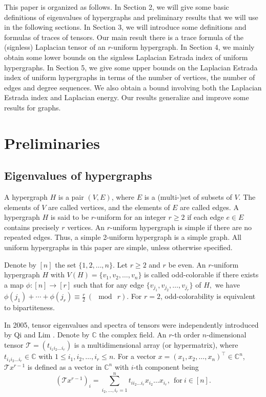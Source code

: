 \documentclass[11pt]{article}
\begin{document}
This paper is organized as follows. In Section 2, we will give some basic definitions of eigenvalues of hypergraphs and preliminary results that we will use in the following sections. In Section 3, we will introduce some definitions and formulas of traces of tensors. Our main result there is a trace formula of the (signless) Laplacian tensor of an $r$-uniform hypergraph. In Section 4, we mainly obtain some lower bounds on the signless Laplacian Estrada index of uniform hypergraphs. In Section 5, we give some upper bounds on the Laplacian Estrada index of uniform hypergraphs in terms of the number of vertices, the number of edges and degree sequences. We also obtain a bound involving both the Laplacian Estrada index and Laplacian energy. Our results generalize and improve some results for graphs.

\section{Preliminaries}
\label{sec:ch-sufficient}
\subsection{Eigenvalues of hypergraphs}

A hypergraph $H$ is a pair $(V,E)$, where $E$ is a (multi-)set of subsets of $V$.
The elements of $V$ are called vertices, and the elements of $E$ are called edges. A hypergraph $H$ is said to be $r$-uniform for an integer $r\geq 2$ if each edge $e\in E$ contains precisely $r$ vertices.  An $r$-uniform hypergraph is simple if there are no repeated edges. Thus, a simple 2-uniform
hypergraph is a simple graph.
All uniform hypergraphs in this paper are simple, unless otherwise specified.

Denote by $[n]$ the set $\{1,2, \ldots,n\}.$ Let $r \geq 2$ and $r$ be even. An $r$-uniform hypergraph $H$ with $V(H)=\{v_{1}, v_{2}, \ldots, v_{n}\}$ is called odd-colorable if there exists a map $\phi : [n] \rightarrow [r]$ such that for any edge $\{v_{j_{1}}, v_{j_{2}}, \ldots , v_{j_{r}}\}$ of $H,$ we have $\phi(j_{1}) + \cdots +\phi(j_{r}) \equiv \frac{r}{2}~(\mod~ r).$ For $r=2$, odd-colorability is equivalent to bipartiteness.

In 2005, tensor eigenvalues and spectra of tensors were independently introduced by Qi \cite{Q} and Lim \cite{L}. Denote by $\mathbb{C}$ the complex field. An $r$-th order $n$-dimensional tensor $\mathcal{T}=(t_{i_{1}i_{2}\ldots i_{r}})$ is a multidimensional array (or hypermatrix), where $t_{i_{1}i_{2}\ldots i_{r}}\in \mathbb{C}$ with $ 1\leq i_{1},i_{2},\ldots,i_{r}\leq n.$ For a vector $x =(x_{1}, x_{2}, \ldots, x_{n})^{\top} \in \mathbb{C}^{n}$, $\mathcal{T} x^{r-1}$ is defined as a vector in $\mathbb{C}^{n}$ with $i$-th component being
$$(\mathcal{T}x^{r-1})_{i}=\sum\limits^{n}_{i_{2},\ldots,i_{r}=1}t_{ii_{2}\ldots i_{r}}x_{i_{2}}\ldots x_{i_{r}},~~ \mbox{for}~ i\in[n].$$
\end{document}
